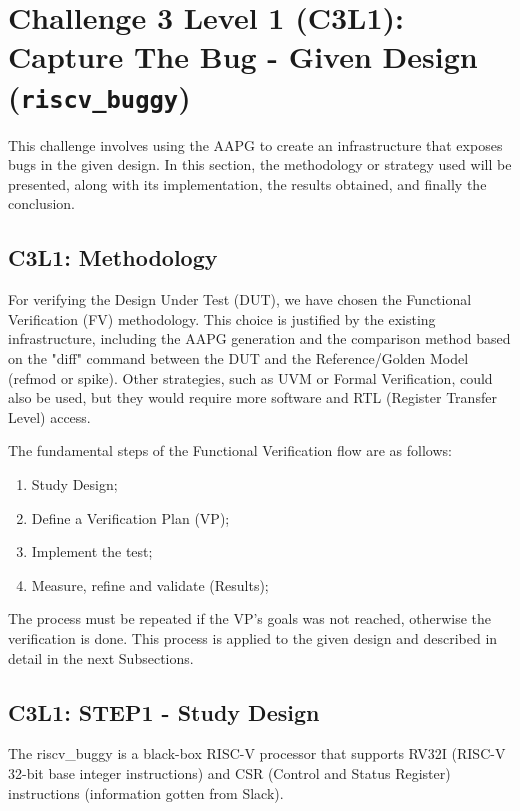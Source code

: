\section{Challenge 3 Level 1 (C3L1): Capture The Bug - Given Design (\texttt{riscv\_buggy})}

This challenge involves using the AAPG to create an infrastructure that exposes bugs in the given design. In this section, the methodology or strategy used will be presented, along with its implementation, the results obtained, and finally the conclusion.

\subsection{C3L1: Methodology}

For verifying the Design Under Test (DUT), we have chosen the Functional Verification (FV) methodology. This choice is justified by the existing infrastructure, including the AAPG generation and the comparison method based on the "diff" command between the DUT and the Reference/Golden Model (refmod or spike). Other strategies, such as UVM or Formal Verification, could also be used, but they would require more software and RTL (Register Transfer Level) access.

The fundamental steps of the Functional Verification flow are as follows:

\begin{enumerate}
    \item Study Design;
    \item Define a Verification Plan (VP); 
    \item Implement the test;
    \item Measure, refine and validate (Results);
\end{enumerate}

The process must be repeated if the VP's goals was not reached, otherwise the verification is done. This process is applied to the given design and described in detail in the next Subsections.

\subsection{C3L1: STEP1 - Study Design}

The riscv\_buggy is a black-box RISC-V processor that supports RV32I (RISC-V 32-bit base integer instructions) and CSR (Control and Status Register) instructions (information gotten from Slack). 

